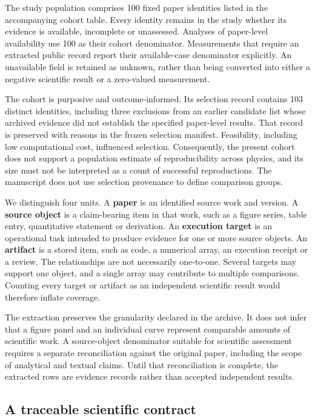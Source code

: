 \documentclass[10pt,a4paper]{article}
\begin{document}
The study population comprises 100 fixed paper identities listed in the
accompanying cohort table. Every identity remains in the study whether
its evidence is available, incomplete or unassessed. Analyses of
paper-level availability use 100 as their cohort denominator.
Measurements that require an extracted public record report their
available-case denominator explicitly. An unavailable field is retained
as unknown, rather than being converted into either a negative
scientific result or a zero-valued measurement.

The cohort is purposive and outcome-informed. Its selection record
contains 103 distinct identities, including three exclusions from an
earlier candidate list whose archived evidence did not establish the
specified paper-level results. That record is preserved with reasons in
the frozen selection manifest. Feasibility, including low computational
cost, influenced selection. Consequently, the present cohort does not
support a population estimate of reproducibility across physics, and its
size must not be interpreted as a count of successful reproductions. The
manuscript does not use selection provenance to define comparison
groups.

We distinguish four units. A \textbf{paper} is an identified source work
and version. A \textbf{source object} is a claim-bearing item in that
work, such as a figure series, table entry, quantitative statement or
derivation. An \textbf{execution target} is an operational task intended
to produce evidence for one or more source objects. An \textbf{artifact}
is a stored item, such as code, a numerical array, an execution receipt
or a review. The relationships are not necessarily one-to-one. Several
targets may support one object, and a single array may contribute to
multiple comparisons. Counting every target or artifact as an
independent scientific result would therefore inflate coverage.

The extraction preserves the granularity declared in the archive. It
does not infer that a figure panel and an individual curve represent
comparable amounts of scientific work. A source-object denominator
suitable for scientific assessment requires a separate reconciliation
against the original paper, including the scope of analytical and
textual claims. Until that reconciliation is complete, the extracted
rows are evidence records rather than accepted independent results.

\subsection{A traceable scientific
contract}\label{a-traceable-scientific-contract}
\end{document}
